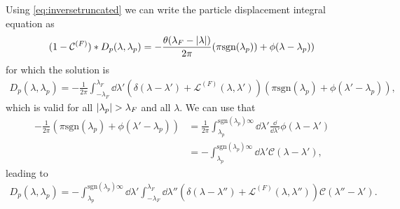 \documentclass[11pt, a4paper]{report} %
\begin{document}
Using \cref{eq:inversetruncated} we can write the particle displacement integral equation as 
\begin{align}
  \label{eq:33}
  (1 - \mathcal{C}^{(F)}) * D_p(\lambda, \lambda_p) = -\frac{\theta(\lambda_F-\abs{\lambda})}{2\pi} (\pi\textrm{sgn}(\lambda_p)) + \phi(\lambda-\lambda_p))
\end{align}
for which the solution is 
\begin{align}
  \label{eq:34}
  D_p(\lambda,\lambda_p) = -\frac{1}{2\pi} \int_{-\lambda_F}^{\lambda_F} \dd \lambda' \left(\delta(\lambda-\lambda') + \mathcal{L}^{(F)}(\lambda,\lambda') \right)(\pi \mathrm{sgn}(\lambda_p) + \phi(\lambda'-\lambda_p)),
\end{align}
which is valid for all \(\abs{\lambda_p}>\lambda_F\) and all \(\lambda\).
We can use that
\begin{align}
  \label{eq:35}
  -\frac{1}{2\pi}(\pi \mathrm{sgn}(\lambda_p) + \phi(\lambda'-\lambda_p)) &= \frac{1}{2\pi} \int_{\lambda_p}^{\mathrm{sgn}(\lambda_p)\infty} \dd \lambda' \frac{\dd}{\dd\lambda'} \phi(\lambda-\lambda') \\
                                                                          &= - \int_{\lambda_p}^{\mathrm{sgn}(\lambda_p)\infty}\dd \lambda' \mathcal{C}(\lambda-\lambda'),
\end{align}
leading to~\cite{Caux2015}
\begin{align}
  \label{eq:particledisplacement}
  	D_p(\lambda, \lambda_p) = - \int_{\lambda_p}^{\textrm{sgn}(\lambda_p)\infty} \dd \lambda' \int_{-\lambda_F}^{\lambda_F} \dd  \lambda'' \left(\delta(\lambda-\lambda'') + \mathcal{L}^{(F)}(\lambda,\lambda'') \right)\mathcal{C}(\lambda''-\lambda').
\end{align}
\end{document}
